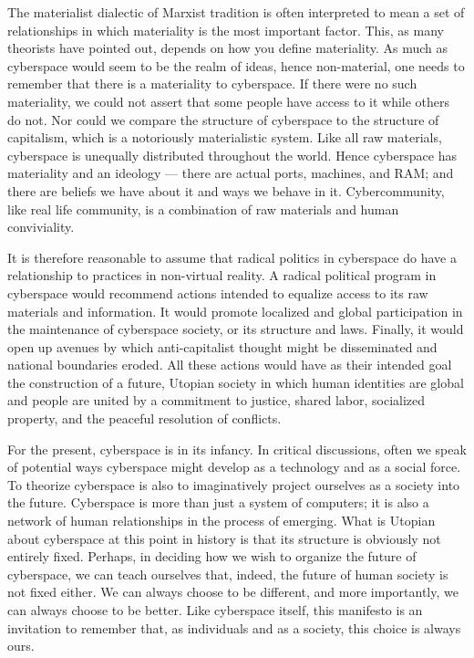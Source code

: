 \documentclass[letterpaper,12pt,english]{sphinxmanual}
\begin{document}
The materialist dialectic of Marxist tradition is often interpreted to mean a set of relationships in which materiality is the most important factor. This, as many theorists have pointed out, depends on how you define materiality. As much as cyberspace would seem to be the realm of ideas, hence non-material, one needs to remember that there is a materiality to cyberspace. If there were no such materiality, we could not assert that some people have access to it while others do not. Nor could we compare the structure of cyberspace to the structure of capitalism, which is a notoriously materialistic system. Like all raw materials, cyberspace is unequally distributed throughout the world. Hence cyberspace has materiality and an ideology — there are actual ports, machines, and RAM; and there are beliefs we have about it and ways we behave in it. Cybercommunity, like real life community, is a combination of raw materials and human conviviality.

It is therefore reasonable to assume that radical politics in cyberspace do have a relationship to practices in non-virtual reality. A radical political program in cyberspace would recommend actions intended to equalize access to its raw materials and information. It would promote localized and global participation in the maintenance of cyberspace society, or its structure and laws. Finally, it would open up avenues by which anti-capitalist thought might be disseminated and national boundaries eroded. All these actions would have as their intended goal the construction of a future, Utopian society in which human identities are global and people are united by a commitment to justice, shared labor, socialized property, and the peaceful resolution of conflicts.

For the present, cyberspace is in its infancy. In critical discussions, often we speak of potential ways cyberspace might develop as a technology and as a social force. To theorize cyberspace is also to imaginatively project ourselves as a society into the future. Cyberspace is more than just a system of computers; it is also a network of human relationships in the process of emerging. What is Utopian about cyberspace at this point in history is that its structure is obviously not entirely fixed. Perhaps, in deciding how we wish to organize the future of cyberspace, we can teach ourselves that, indeed, the future of human society is not fixed either. We can always choose to be different, and more importantly, we can always choose to be better. Like cyberspace itself, this manifesto is an invitation to remember that, as individuals and as a society, this choice is always ours.
\end{document}
